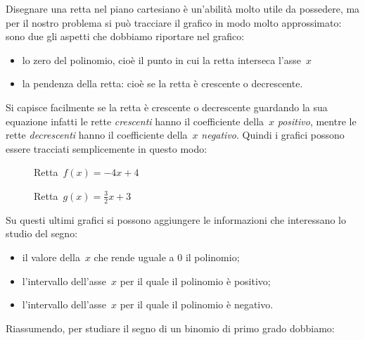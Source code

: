 Disegnare una retta nel piano cartesiano è un'abilità molto utile da 
possedere, ma per il nostro problema si può tracciare il grafico in modo 
molto approssimato: sono due gli aspetti che dobbiamo riportare nel grafico:

\begin{itemize} [noitemsep]
 \item 
  lo zero del polinomio, cioè il punto in cui la retta interseca l'asse~$x$
 \item
  la pendenza della retta: cioè se la retta è crescente o decrescente.
\end{itemize}

Si capisce facilmente se la retta è crescente o decrescente guardando la sua 
equazione infatti le rette \emph{crescenti} hanno il coefficiente della~$x$ 
\emph{positivo}, mentre le rette \emph{decrescenti} hanno il coefficiente 
della~$x$ \emph{negativo}.
Quindi i grafici possono essere tracciati semplicemente in questo modo:

\begin{inaccessibleblock}
 \begin{figure}[h]
 \centering
 \begin{minipage}[]{.45\textwidth}
  \centering
  \caption{Retta~$f(x) = -4 x +4$}
 \end{minipage}
 \begin{minipage}[]{.45\textwidth}
  \centering
  \caption{Retta~$g(x) = \frac{3}{2} x +3$}
 \end{minipage}
\end{figure}
\end{inaccessibleblock}

Su questi ultimi grafici si possono aggiungere le informazioni che 
interessano lo studio del segno:

\begin{itemize} [noitemsep]
 \item il valore della~$x$ che rende uguale a 0 il polinomio;
 \item l'intervallo dell'asse~$x$ per il quale il polinomio è positivo;
 \item l'intervallo dell'asse~$x$ per il quale il polinomio è negativo.
\end{itemize}

Riassumendo, per studiare il segno di un binomio di primo grado dobbiamo: 

